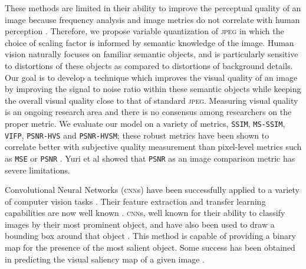These methods are limited in their ability to improve the perceptual quality of an image because frequency analysis and image metrics do not correlate with human perception \cite{xxx_klein1992relevance}.
Therefore, we propose variable quantization of \textsc{jpeg} in which the choice of scaling factor is informed by semantic knowledge of the image.
Human vision naturally focuses on familiar semantic objects, and is particularly sensitive to distortions of these objects as compared to distortions of background details.
Our goal is to develop a technique which improves the visual quality of an image by improving the signal to noise ratio within these semantic objects while keeping the overall visual quality close to that of standard \textsc{jpeg}. 
Measuring visual quality is an ongoing research area and there is no consensus among researchers on the proper metric. 
We evaluate our model on a variety of metrics, \texttt{SSIM}\cite{xxx_ssim}, \texttt{MS-SSIM}\cite{xxx_msssim}, \texttt{VIFP}\cite{xxx_vifp}, \texttt{PSNR-HVS}\cite{xxx_psnrhvs} and \texttt{PSNR-HVSM}\cite{xxx_psnrhvsm}; these robust metrics have been shown to correlate better with subjective quality measurement than pixel-level metrics such as \texttt{MSE} or \texttt{PSNR} \cite{xxx_psnrhvsm}.
Yuri et al \cite{xxx_kerofsky2015perceptual} showed that \texttt{PSNR} as an image comparison metric has severe limitations.

Convolutional Neural Networks (\textsc{cnn}s) have been successfully applied to a variety of computer vision tasks \cite{xxx_he2015deep} \cite{xxx_krizhevsky2012imagenet}.
Their feature extraction and transfer learning capabilities are now well known\cite{xxx_zeiler2014visualizing} .
\textsc{cnn}s, well known for their ability to classify images by their most prominent object, and have also been used to draw a bounding box around that object \cite{xxx_girshick2014rich}.
This method is capable of providing a binary map for the presence of the most salient object. Some success has been obtained in predicting the visual saliency map of a given image \cite{xxx_jiang2015salicon} \cite{xxx_kummerer2014deep}.

